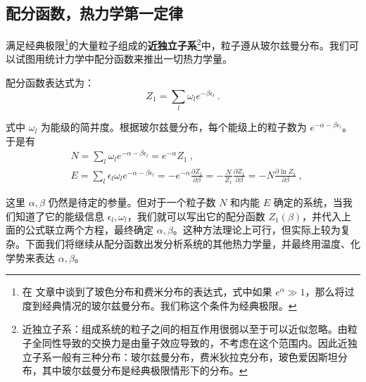 


\subsection{配分函数，热力学第一定律}

满足经典极限\footnote{在 文章中谈到了玻色分布和费米分布的表达式，式中如果 $e^\alpha\gg 1$，那么将过度到经典情况的玻尔兹曼分布。我们称这个条件为经典极限。}的大量粒子组成的\textbf{近独立子系}\footnote{近独立子系：组成系统的粒子之间的相互作用很弱以至于可以近似忽略。由粒子全同性导致的交换力是由量子效应导致的，不考虑在这个范围内。因此近独立子系一般有三种分布：玻尔兹曼分布，费米狄拉克分布，玻色爱因斯坦分布，其中玻尔兹曼分布是经典极限情形下的分布。}中，粒子遵从玻尔兹曼分布。我们可以试图用统计力学中配分函数来推出一切热力学量。

配分函数表达式为：
\begin{equation}
Z_1=\sum_l \omega_l e^{-\beta \epsilon_l}~.
\end{equation}

式中 $\omega_l$ 为能级的简并度。根据玻尔兹曼分布，每个能级上的粒子数为 $e^{-\alpha-\beta\epsilon_l}$。于是有
\begin{equation}\label{eq_TheSta_4}
\begin{aligned}
&N=\sum_l \omega_l e^{-\alpha-\beta\epsilon_l}=e^{-\alpha} Z_1~,\\
&E=\sum_l \epsilon_l \omega_l e^{-\alpha-\beta\epsilon_l}=-e^{-\alpha}\frac{\partial Z_1}{\partial \beta}=-\frac{N}{Z_1}\frac{\partial Z_1}{\partial \beta}=-N\frac{\partial \ln Z_1}{\partial \beta}~,
\end{aligned}
\end{equation}

这里 $\alpha,\beta$ 仍然是待定的参量。但对于一个粒子数 $N$ 和内能 $E$ 确定的系统，当我们知道了它的能级信息 $\epsilon_l,\omega_l$，我们就可以写出它的配分函数 $Z_1(\beta)$，并代入上面的公式联立两个方程，最终确定 $\alpha,\beta$。这种方法理论上可行，但实际上较为复杂。下面我们将继续从配分函数出发分析系统的其他热力学量，并最终用温度、化学势来表达 $\alpha,\beta$。
